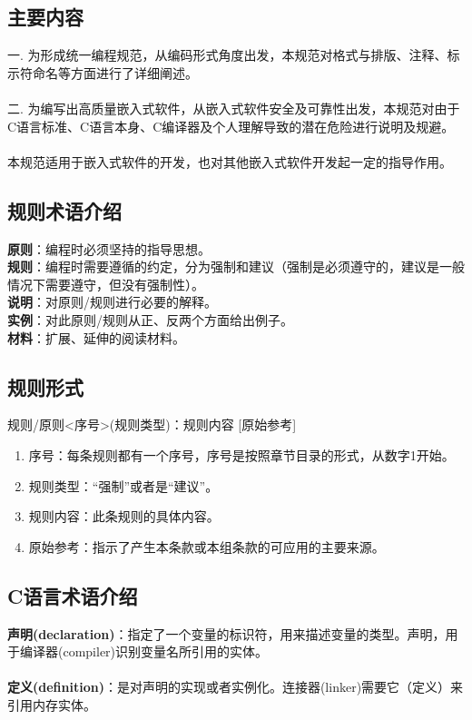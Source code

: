\documentclass[UTF8,a4paper,12pt]{article}
\begin{document}
	\subsection{主要内容}
	一. 为形成统一编程规范，从编码形式角度出发，本规范对格式与排版、注释、标示符命名等方面进行了详细阐述。\\
	\\
	二. 为编写出高质量嵌入式软件，从嵌入式软件安全及可靠性出发，本规范对由于C语言标准、C语言本身、C编译器及个人理解导致的潜在危险进行说明及规避。\\
	\\
	本规范适用于嵌入式软件的开发，也对其他嵌入式软件开发起一定的指导作用。\\
	
	\subsection{规则术语介绍}
	\textbf{原则}：编程时必须坚持的指导思想。\\
	\textbf{规则}：编程时需要遵循的约定，分为强制和建议（强制是必须遵守的，建议是一般情况下需要遵守，但没有强制性）。\\
	\textbf{说明}：对原则/规则进行必要的解释。\\
	\textbf{实例}：对此原则/规则从正、反两个方面给出例子。\\
	\textbf{材料}：扩展、延伸的阅读材料。\\
	
	\subsection{规则形式}
	\centerline{规则/原则<序号>(规则类型)：规则内容 [原始参考]}
	\begin{enumerate}
	\item 序号：每条规则都有一个序号，序号是按照章节目录的形式，从数字1开始。
	\item 规则类型：“强制”或者是“建议”。
	\item 规则内容：此条规则的具体内容。
	\item 原始参考：指示了产生本条款或本组条款的可应用的主要来源。
	\end{enumerate}

	\subsection{C语言术语介绍}
	\textbf{声明(declaration)}：指定了一个变量的标识符，用来描述变量的类型。声明，用于编译器(compiler)识别变量名所引用的实体。\\
	\\
	\textbf{定义(definition)}：是对声明的实现或者实例化。连接器(linker)需要它（定义）来引用内存实体。\\
	
\end{document}
